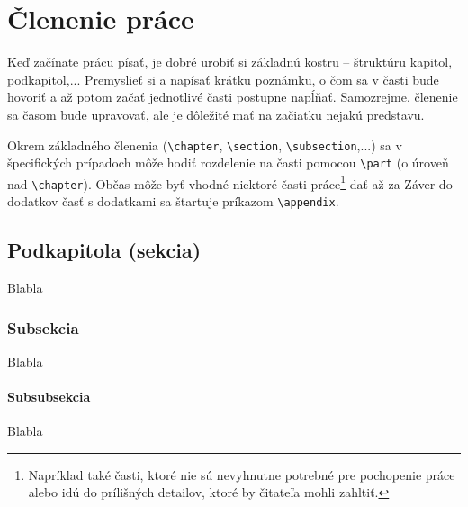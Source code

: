 \chapter{Členenie práce}\label{sec:clenenie}

Keď začínate prácu písať, je dobré urobiť si základnú kostru -- štruktúru kapitol, podkapitol,... Premyslieť si a napísať krátku poznámku, o čom sa v časti bude hovoriť a až potom začať jednotlivé časti postupne napĺňať. Samozrejme, členenie sa časom bude upravovať, ale je dôležité mať na začiatku nejakú predstavu.

Okrem základného členenia (\verb|\chapter|, \verb|\section|, \verb|\subsection|,...) sa v špecifických prípadoch môže hodiť rozdelenie na časti pomocou \verb|\part| (o úroveň nad \verb|\chapter|). Občas môže byť vhodné niektoré časti práce\footnote{Napríklad také časti, ktoré nie sú nevyhnutne potrebné pre pochopenie práce alebo idú do prílišných detailov, ktoré by čitateľa mohli zahltiť.} dať až za Záver do dodatkov časť s dodatkami sa štartuje príkazom \verb|\appendix|.


\section{Podkapitola (sekcia)}\label{sec:sekcia}
Blabla

\subsection{Subsekcia}
Blabla

\subsubsection{Subsubsekcia}
Blabla

%
